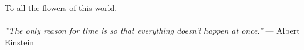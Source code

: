 \thispagestyle{empty}\mbox{}{\textheight}\mbox{}\hfill\begin{minipage}{0.55\textwidth}%

To all the flowers of this world.\\\\
\textit{''The only reason for time is so that everything doesn't happen at once.''}
\flushright --- Albert Einstein
\normalfont\end{minipage}